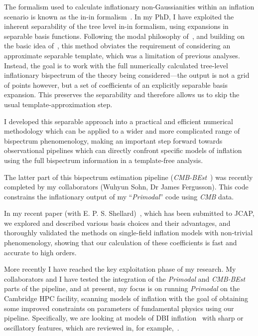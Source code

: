 The formalism used to calculate inflationary non-Gaussianities within an inflation scenario is
known as the in-in formalism~\cite{weinberg_in_in}.
In my PhD, I have exploited the inherent separability of the tree level in-in formalism,
using expansions in separable basis functions. Following the modal philosophy of~\cite{FergShell_3}, and building on the basic idea of~\cite{Funakoshi}, this method obviates the requirement of considering an approximate separable template,
which was a limitation of previous analyses. Instead,
the goal is to work with the full numerically calculated tree-level inflationary bispectrum of the theory
being considered---the output is not a grid of points however, but a set of coefficients of
an explicitly separable basis expansion.
This preserves the separability and therefore allows us to skip the usual template-approximation step.

I developed this separable approach into a practical and efficient numerical methodology which can be applied to a
wider and more complicated range of bispectrum phenomenology, making an important step forward towards observational
pipelines which can directly confront specific models of inflation using the full bispectrum information in a template-free analysis.

The latter part of this bispectrum estimation pipeline (\textit{CMB-BEst}~\cite{Sohn_2021}) was recently completed
by my collaborators (Wuhyun Sohn, Dr James Fergusson).
This code constrains the inflationary output of my ``\textit{Primodal}'' code using \textit{CMB} data.

In my recent paper (with E. P. S. Shellard)~\cite{probing_precision}, which has been submitted to JCAP,
we explored and described various basis choices and their advantages, and thoroughly validated the methods on single-field inflation models with non-trivial phenomenology, showing that our calculation of these coefficients is fast and accurate to high orders.


More recently I have reached the key exploitation phase of my research.
My collaborators and I have tested the integration of the \textit{Primodal} and \textit{CMB-BEst}
parts of the pipeline, and at present, my focus is on running \textit{Primodal} on the Cambridge HPC facility,
scanning models of inflation with the goal of obtaining some improved constraints on parameters of fundamental
physics using our pipeline.
Specifically, we are looking at models of DBI inflation~\cite{dbi_in_the_sky} with sharp or
oscillatory features, which are reviewed in, for example,~\cite{astro2020_features}.


